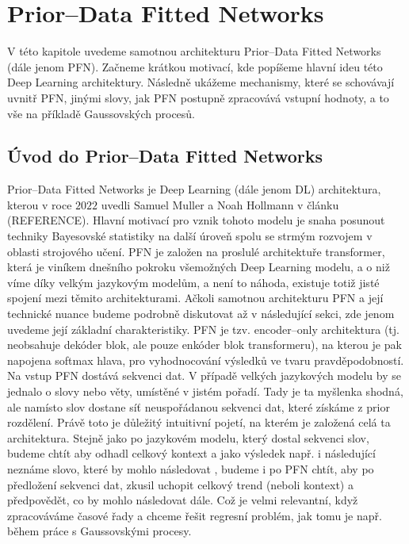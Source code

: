\chapter{Prior–Data Fitted Networks}


V této kapitole uvedeme samotnou architekturu Prior–Data Fitted Networks (dále jenom PFN).
Začneme krátkou motivací, kde popíšeme hlavní ideu této Deep Learning architektury.
Následně ukážeme mechanismy, které se schovávají uvnitř PFN, jinými slovy, jak PFN postupně zpracovává vstupní hodnoty, a to vše na příkladě Gaussovských procesů.

\section{Úvod do Prior–Data Fitted Networks}

Prior–Data Fitted Networks je Deep Learning (dále jenom DL) architektura, kterou v roce $2022$ uvedli Samuel Muller a Noah Hollmann v článku (REFERENCE).
Hlavní motivací pro vznik tohoto modelu je snaha posunout techniky Bayesovské statistiky na další úroveň spolu se strmým rozvojem v oblasti strojového učení. 
PFN je založen na proslulé architektuře transformer, která je viníkem dnešního pokroku všemožných Deep Learning modelu, a o niž víme díky velkým jazykovým modelům, a není to náhoda, existuje totiž jisté spojení mezi těmito architekturami. 
Ačkoli samotnou architekturu PFN a její technické nuance budeme podrobně diskutovat až v následující sekci, zde jenom uvedeme její základní charakteristiky.
PFN je tzv. encoder–only architektura (tj. neobsahuje dekóder blok, ale pouze enkóder blok transformeru), na kterou je pak napojena softmax hlava, pro vyhodnocování výsledků ve tvaru pravděpodobností.
Na vstup PFN dostává sekvenci dat.
V případě velkých jazykových modelu by se jednalo o slovy nebo věty, umístěné v jistém pořadí.
Tady je ta myšlenka shodná, ale namísto slov dostane síť neuspořádanou sekvenci dat, které získáme z prior rozdělení.  
Právě toto je důležitý intuitivní pojetí, na kterém je založená celá ta architektura.
Stejně jako po jazykovém modelu, který dostal sekvenci slov, budeme chtít aby odhadl celkový kontext a jako výsledek např. i následující neznáme slovo, které by mohlo následovat , budeme i po PFN chtít, aby po předložení sekvenci dat, zkusil uchopit celkový trend (neboli kontext) a předpovědět, co by mohlo následovat dále.
Což je velmi relevantní, když zpracováváme časové řady a chceme řešit regresní problém, jak tomu je např. během práce s Gaussovskými procesy.
\par 

